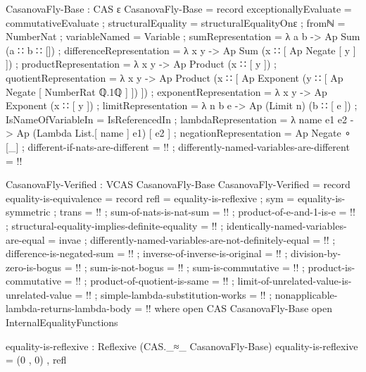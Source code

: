 \documentclass{report}
\begin{document}
\begin{code}
CasanovaFly-Base : CAS ε
CasanovaFly-Base = record
  { exceptionallyEvaluate = commutativeEvaluate
  ; structuralEquality = structuralEqualityOnε
  ; fromℕ = NumberNat
  ; variableNamed = Variable
  ; sumRepresentation = λ a b -> Ap Sum (a ∷ b ∷ [])
  ; differenceRepresentation = λ x y -> Ap Sum (x ∷ [ Ap Negate [ y ] ])
  ; productRepresentation = λ x y -> Ap Product (x ∷ [ y ])
  ; quotientRepresentation = λ x y ->
     Ap Product (x ∷ [ Ap Exponent (y ∷ [ Ap Negate [ NumberRat ℚ.1ℚ ] ]) ])
  ; exponentRepresentation = λ x y -> Ap Exponent (x ∷ [ y ])
  ; limitRepresentation = λ n b e -> Ap (Limit n) (b ∷ [ e ])
  ; IsNameOfVariableIn = IsReferencedIn
  ; lambdaRepresentation = λ name e1 e2 -> Ap (Lambda List.[ name ] e1) [ e2 ]
  ; negationRepresentation = Ap Negate ∘ [_]
  ; different-if-nats-are-different = {!!}
  ; differently-named-variables-are-different = {!!}
  }

CasanovaFly-Verified : VCAS CasanovaFly-Base
CasanovaFly-Verified = record
  { equality-is-equivalence = record
    { refl = equality-is-reflexive
    ; sym = equality-is-symmetric
    ; trans = {!!}
    }
  ; sum-of-nats-is-nat-sum = {!!}
  ; product-of-e-and-1-is-e = {!!}
  ; structural-equality-implies-definite-equality = {!!}
  ; identically-named-variables-are-equal = invae
  ; differently-named-variables-are-not-definitely-equal = {!!}
  ; difference-is-negated-sum = {!!}
  ; inverse-of-inverse-is-original = {!!}
  ; division-by-zero-is-bogus = {!!}
  ; sum-is-not-bogus = {!!}
  ; sum-is-commutative = {!!}
  ; product-is-commutative = {!!}
  ; product-of-quotient-is-same = {!!}
  ; limit-of-unrelated-value-is-unrelated-value = {!!}
  ; simple-lambda-substitution-works = {!!}
  ; nonapplicable-lambda-returns-lambda-body = {!!}
  }
  where
  open CAS CasanovaFly-Base
  open InternalEqualityFunctions

  equality-is-reflexive : Reflexive (CAS._≈_ CasanovaFly-Base)
  equality-is-reflexive = (0 , 0) , refl


\end{code}
\end{document}
